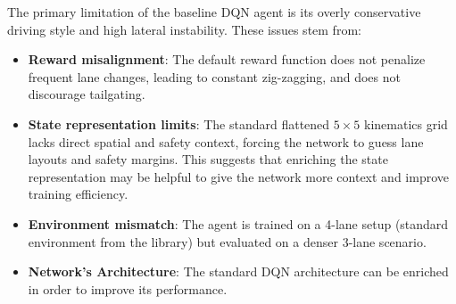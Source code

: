 \documentclass{article}
\begin{document}
The primary limitation of the baseline DQN agent is its overly conservative driving style and high lateral instability. These issues stem from:
\begin{itemize}
    \item \textbf{Reward misalignment}: The default reward function does not penalize frequent lane changes, leading to constant zig-zagging, and does not discourage tailgating.
    \item \textbf{State representation limits}: The standard flattened $5 \times 5$ kinematics grid lacks direct spatial and safety context, forcing the network to guess lane layouts and safety margins. This suggests that enriching the state representation may be helpful to give the network more context and improve training efficiency.
    \item \textbf{Environment mismatch}: The agent is trained on a 4-lane setup (standard environment from the library) but evaluated on a denser 3-lane scenario.
    \item \textbf{Network's Architecture}: The standard DQN architecture can be enriched in order to improve its performance.
\end{itemize}
\end{document}
